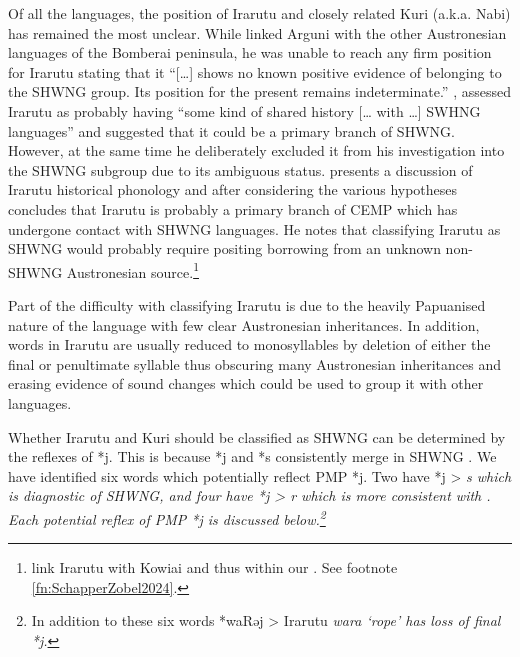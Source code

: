 \largerpage
{}
Of all the  languages,
the position of Irarutu
and closely related Kuri (a.k.a.
Nabi) has remained the most unclear.
While \citet{Blust1993} linked Arguni with the other Austronesian
languages of the Bomberai peninsula,
he was unable to reach any firm position for Irarutu stating
that it “[{\ldots}] shows no known positive evidence of belonging
to the SHWNG group.
Its position for the present remains indeterminate.” \citet[31]{Kamholz2014},
assessed Irarutu as probably having “some kind of shared history
[{\ldots} with {\ldots}] SWHNG languages”
and suggested that it could be a primary branch of SHWNG.
However, at the same time he deliberately excluded it from his
investigation into the SHWNG subgroup due to its ambiguous status.
\citet[242f]{Jackson2014} presents a discussion of Irarutu historical
phonology and after considering the various hypotheses concludes that Irarutu
is probably a primary branch of CEMP which has undergone contact with SHWNG languages.
He notes that classifying Irarutu as SHWNG would probably require
positing borrowing from an unknown non-SHWNG Austronesian source.\footnote{
		\citet{SchapperZobel2024b} link Irarutu with Kowiai and
		thus within our .
		See footnote \ref{fn:SchapperZobel2024}.}

Part of the difficulty with classifying Irarutu is due to the
heavily Papuanised nature of the language with few clear Austronesian inheritances.
In addition, words in Irarutu are usually reduced to monosyllables
by deletion of either the final or penultimate syllable thus
obscuring many Austronesian inheritances
and erasing evidence of sound changes which could be used to
group it with other languages.

Whether Irarutu and Kuri should be classified as SHWNG can be
determined by the reflexes of *j.
This is because *j
and *s consistently merge in SHWNG \citep[52]{Kamholz2014}.
We have identified six words which potentially reflect PMP *j.
Two have *j > \it{s} which is diagnostic of SHWNG,
and four have *j > \it{r} which is more consistent with .
Each potential reflex of PMP *j is discussed below.\footnote{
		In addition to these six words *waRəj > Irarutu \it{wara} ‘rope’
		has loss of final *j.}

